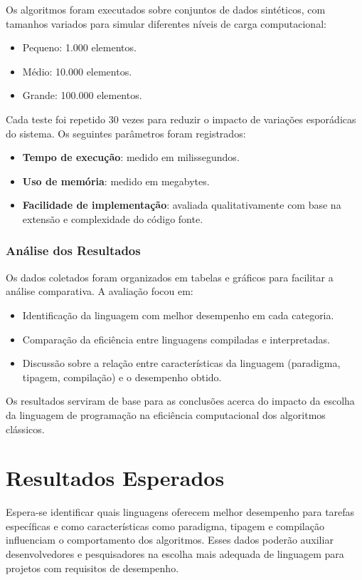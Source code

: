 \documentclass[12pt,oneside,a4paper]{report}
\begin{document}
Os algoritmos foram executados sobre conjuntos de dados sintéticos, com tamanhos variados para simular diferentes níveis de carga computacional:

\begin{itemize}
    \item Pequeno: 1.000 elementos.
    \item Médio: 10.000 elementos.
    \item Grande: 100.000 elementos.
\end{itemize}

Cada teste foi repetido 30 vezes para reduzir o impacto de variações esporádicas do sistema. Os seguintes parâmetros foram registrados:

\begin{itemize}
    \item \textbf{Tempo de execução}: medido em milissegundos.
    \item \textbf{Uso de memória}: medido em megabytes.
    \item \textbf{Facilidade de implementação}: avaliada qualitativamente com base na extensão e complexidade do código fonte.
\end{itemize}

\subsection{Análise dos Resultados}

Os dados coletados foram organizados em tabelas e gráficos para facilitar a análise comparativa. A avaliação focou em:

\begin{itemize}
    \item Identificação da linguagem com melhor desempenho em cada categoria.
    \item Comparação da eficiência entre linguagens compiladas e interpretadas.
    \item Discussão sobre a relação entre características da linguagem (paradigma, tipagem, compilação) e o desempenho obtido.
\end{itemize}

Os resultados serviram de base para as conclusões acerca do impacto da escolha da linguagem de programação na eficiência computacional dos algoritmos clássicos.

\chapter{Resultados Esperados}
Espera-se identificar quais linguagens oferecem melhor desempenho para tarefas específicas e como características como paradigma, tipagem e compilação influenciam o comportamento dos algoritmos. Esses dados poderão auxiliar desenvolvedores e pesquisadores na escolha mais adequada de linguagem para projetos com requisitos de desempenho.
\end{document}
